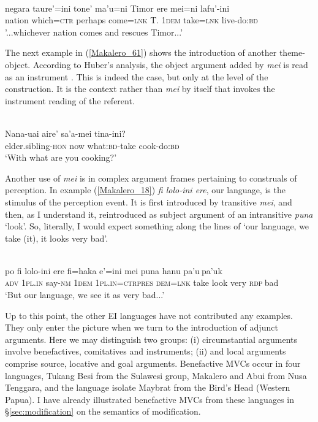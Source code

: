 \ea \label{Makalero_56}
\\
\gll negara taure’=ini tone’ ma’u=ni Timor ere mei=ni lafu’-ini \\
nation which=\textsc{ctr} perhaps come=\textsc{lnk} T. 1\textsc{dem} take=\textsc{lnk} live-do:\textsc{bd} \\
\glft '...whichever nation comes and rescues Timor...’\\ 
\z

The next example in (\ref{Makalero_61}) shows the introduction of another theme-object. According to Huber's analysis, the object argument added by \textit{mei} is read as an instrument \citep[204]{huber2011}. This is indeed the case, but only at the level of the construction. It is the context rather than \textit{mei} by itself that invokes the instrument reading of the referent.

\ea \label{Makalero_61}
\\
\gll Nana-uai aire’ sa’a-mei tina-ini? \\
elder.sibling-\textsc{hon} now what:\textsc{bd}-take cook-do:\textsc{bd} \\
\glft ‘With what are you cooking?’\\ 
\z

Another use of \textit{mei} is in complex argument frames pertaining to construals of perception. In example (\ref{Makalero_18}) \textit{fi lolo-ini ere}, our language, is the stimulus of the perception event. It is first introduced by transitive \textit{mei}, and then, as I understand it, reintroduced as subject argument of an intransitive \textit{puna} `look'. So, literally, I would expect something along the lines of `our language, we take (it), it looks very bad'.

\ea \label{Makalero_18}
\\
\gll po fi lolo-ini ere fi=haka e’=ini mei puna hanu pa’u$~$pa’uk \\
\textsc{adv} 1\textsc{pl}.\textsc{in} say-\textsc{nm} 1\textsc{dem} 1\textsc{pl}.\textsc{in}=\textsc{ctrpres} \textsc{dem}=\textsc{lnk} take look very \textsc{rdp}$~$bad \\
\glft ‘But our language, we see it as very bad...’\\ 
\z

Up to this point, the other EI languages have not contributed any examples. They only enter the picture when we turn to the introduction of adjunct arguments. Here we may distinguish two groups: (i) circumstantial arguments involve benefactives, comitatives and instruments; (ii) and local arguments comprise source, locative and goal arguments. Benefactive MVCs occur in four languages, Tukang Besi from the Sulawesi group, Makalero and Abui from Nusa Tenggara, and the language isolate Maybrat from the Bird's Head (Western Papua). I have already illustrated benefactive MVCs from these languages in §\ref{sec:modification} on the semantics of modification.

